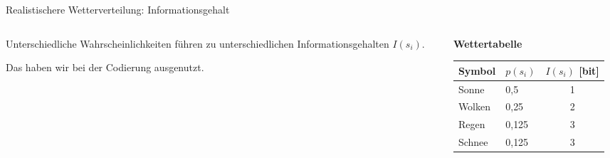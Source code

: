 \begin{frame}{Realistischere Wetterverteilung: Informationsgehalt}

\begin{columns}

\begin{column}{0.5\textwidth}

Unterschiedliche Wahrscheinlichkeiten führen zu unterschiedlichen
Informationsgehalten \(I(s_i)\).  

\medskip
Das haben wir bei der Codierung ausgenutzt.


\end{column}

\begin{column}{0.45\textwidth}

\textbf{Wettertabelle}
\begin{center}
\begin{tabular}{llc}
\hline
Symbol & \(p(s_i)\) & \(I(s_i)\) [bit] \\
\hline
Sonne  & 0{,}5   & 1 \\
Wolken & 0{,}25  & 2 \\
Regen  & 0{,}125 & 3 \\
Schnee & 0{,}125 & 3 \\
\hline
\end{tabular}
\end{center}

\end{column}

\end{columns}

\end{frame}

